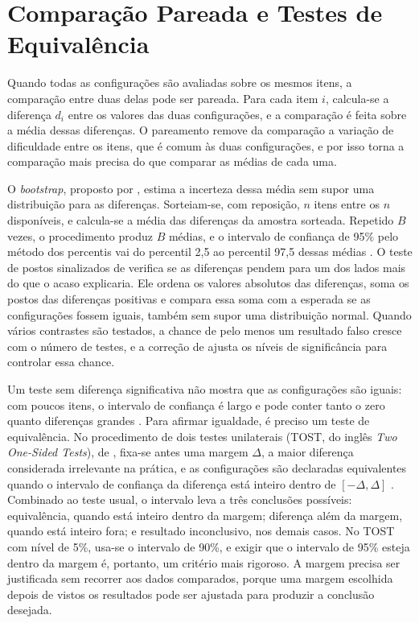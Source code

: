\section{Comparação Pareada e Testes de Equivalência}
\label{sec:estatistica}\label{subsec:estatistica}

Quando todas as configurações são avaliadas sobre os mesmos itens, a comparação entre duas delas pode ser pareada. Para cada item $i$, calcula-se a diferença $d_i$ entre os valores das duas configurações, e a comparação é feita sobre a média dessas diferenças. O pareamento remove da comparação a variação de dificuldade entre os itens, que é comum às duas configurações, e por isso torna a comparação mais precisa do que comparar as médias de cada uma.

O \textit{bootstrap}, proposto por , estima a incerteza dessa média sem supor uma distribuição para as diferenças. Sorteiam-se, com reposição, $n$ itens entre os $n$ disponíveis, e calcula-se a média das diferenças da amostra sorteada. Repetido $B$ vezes, o procedimento produz $B$ médias, e o intervalo de confiança de 95\% pelo método dos percentis vai do percentil 2,5 ao percentil 97,5 dessas médias \cite{efron1993introduction}. O teste de postos sinalizados de  verifica se as diferenças pendem para um dos lados mais do que o acaso explicaria. Ele ordena os valores absolutos das diferenças, soma os postos das diferenças positivas e compara essa soma com a esperada se as configurações fossem iguais, também sem supor uma distribuição normal. Quando vários contrastes são testados, a chance de pelo menos um resultado falso cresce com o número de testes, e a correção de  ajusta os níveis de significância para controlar essa chance.

Um teste sem diferença significativa não mostra que as configurações são iguais: com poucos itens, o intervalo de confiança é largo e pode conter tanto o zero quanto diferenças grandes \cite{altman1995absence}. Para afirmar igualdade, é preciso um teste de equivalência. No procedimento de dois testes unilaterais (TOST, do inglês \textit{Two One-Sided Tests}), de , fixa-se antes uma margem $\Delta$, a maior diferença considerada irrelevante na prática, e as configurações são declaradas equivalentes quando o intervalo de confiança da diferença está inteiro dentro de $[-\Delta, \Delta]$ \cite{lakens2017equivalence}. Combinado ao teste usual, o intervalo leva a três conclusões possíveis: equivalência, quando está inteiro dentro da margem; diferença além da margem, quando está inteiro fora; e resultado inconclusivo, nos demais casos. No TOST com nível de 5\%, usa-se o intervalo de 90\%, e exigir que o intervalo de 95\% esteja dentro da margem é, portanto, um critério mais rigoroso. A margem precisa ser justificada sem recorrer aos dados comparados, porque uma margem escolhida depois de vistos os resultados pode ser ajustada para produzir a conclusão desejada.
